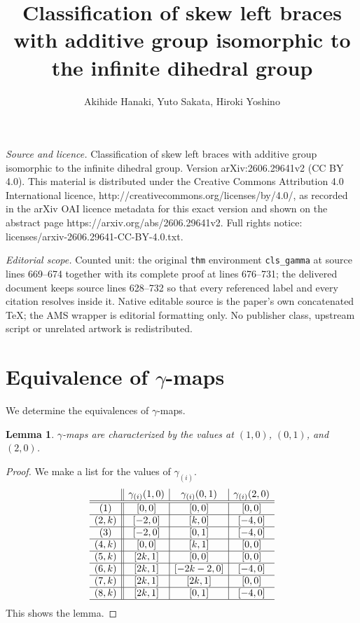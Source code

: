 \documentclass[10pt,a4paper]{amsart}
\newtheorem{lemm}[thm]{Lemma}
\begin{document}
\title[Classification of skew left braces with additive group isomo]{Classification of skew left braces with additive group isomorphic to the infinite dihedral group}
\author{Akihide Hanaki, Yuto Sakata, Hiroki Yoshino}
\date{}
\maketitle
\noindent\emph{Source and licence.} Classification of skew left braces with additive group isomorphic to the infinite dihedral group. Version arXiv:2606.29641v2 (CC BY 4.0). This material is distributed under the Creative Commons Attribution 4.0 International licence, http://creativecommons.org/licenses/by/4.0/, as recorded in the arXiv OAI licence metadata for this exact version and shown on the abstract page https://arxiv.org/abs/2606.29641v2. Full rights notice: licenses/arxiv-2606.29641-CC-BY-4.0.txt.\par\smallskip
\noindent\textit{Editorial scope.} Counted unit: the original \texttt{thm} environment \texttt{cls\_gamma} at source lines 669--674 together with its complete proof at lines 676--731; the delivered document keeps source lines 628--732 so that every referenced label and every citation resolves inside it. Native editable source is the paper's own concatenated TeX; the AMS wrapper is editorial formatting only. No publisher class, upstream script or unrelated artwork is redistributed.
\section{Equivalence of $\gamma$-maps}
We determine the equivalences of $\gamma$-maps.

\begin{lemm}\label{lemCindy}
  $\gamma$-maps are characterized by the values at
  $(1,0)$, $(0,1)$, and $(2,0)$.
\end{lemm}

\begin{proof}
  We make a list for the values of $\gamma_{(i)}$. 
  $$
    \begin{array}{c||c|c|c}
      & \gamma_{(i)}(1,0) & \gamma_{(i)}(0,1) &\gamma_{(i)}(2,0)\\
      \hline
      \hline
      (1) & [0,0] & [0,0] & [0,0] \\
      \hline
      (2,k) & [-2,0] & [k,0] & [-4,0]\\
      \hline
      (3) & [-2,0] & [0,1] & [-4,0]\\
      \hline
      (4,k) & [0,0] & [k,1] & [0,0]\\
      \hline
      (5,k) & [2k,1] & [0,0] & [0,0]\\
      \hline
      (6,k) & [2k,1] & [-2k-2,0] & [-4,0]\\
      \hline
      (7,k) & [2k,1] & [2k,1] & [0,0]\\
      \hline
      (8,k) & [2k,1] & [0,1] & [-4,0]\\
      \hline
    \end{array}
  $$
  This shows the lemma.
\end{proof}
\end{document}
